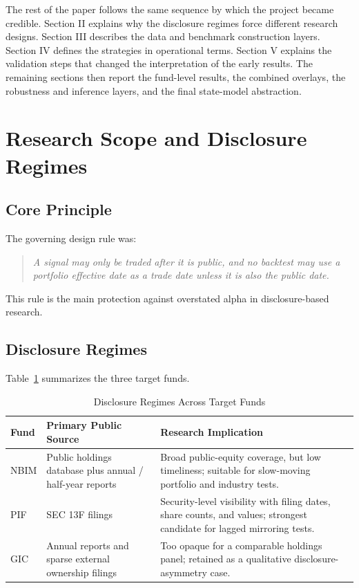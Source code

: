 \documentclass[conference]{IEEEtran}
\begin{document}
The rest of the paper follows the same sequence by which the project became credible. Section II explains why the disclosure regimes force different research designs. Section III describes the data and benchmark construction layers. Section IV defines the strategies in operational terms. Section V explains the validation steps that changed the interpretation of the early results. The remaining sections then report the fund-level results, the combined overlays, the robustness and inference layers, and the final state-model abstraction.

\section{Research Scope and Disclosure Regimes}

\subsection{Core Principle}

The governing design rule was:
\begin{quote}
\textit{A signal may only be traded after it is public, and no backtest may use a portfolio effective date as a trade date unless it is also the public date.}
\end{quote}

This rule is the main protection against overstated alpha in disclosure-based research.

\subsection{Disclosure Regimes}

Table~\ref{tab:disclosure} summarizes the three target funds.

\begin{table}[!t]
\caption{Disclosure Regimes Across Target Funds}
\label{tab:disclosure}
\centering
\begin{tabularx}{\columnwidth}{>{\raggedright\arraybackslash}p{1.4cm} >{\raggedright\arraybackslash}p{2.2cm} X}
\toprule
\textbf{Fund} & \textbf{Primary Public Source} & \textbf{Research Implication} \\
\midrule
NBIM & Public holdings database plus annual / half-year reports & Broad public-equity coverage, but low timeliness; suitable for slow-moving portfolio and industry tests. \\
PIF & SEC 13F filings & Security-level visibility with filing dates, share counts, and values; strongest candidate for lagged mirroring tests. \\
GIC & Annual reports and sparse external ownership filings & Too opaque for a comparable holdings panel; retained as a qualitative disclosure-asymmetry case. \\
\bottomrule
\end{tabularx}
\end{table}
\end{document}
